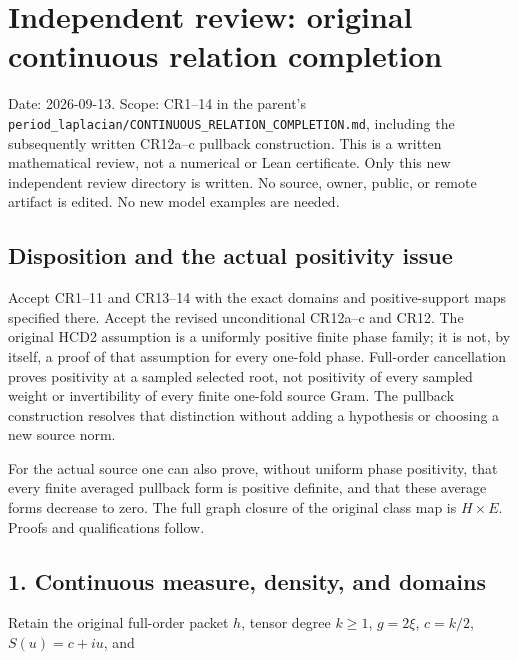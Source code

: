 \documentclass{article}
\begin{document}
\maketitle
\section{Independent review: original continuous relation completion}\label{independent-review-original-continuous-relation-completion}

Date: 2026-09-13. Scope: CR1--14 in the parent's \nolinkurl{period_laplacian/CONTINUOUS_RELATION_COMPLETION.md}, including the subsequently written CR12a--c pullback construction. This is a written mathematical review, not a numerical or Lean certificate. Only this new independent review directory is written. No source, owner, public, or remote artifact is edited. No new model examples are needed.

\subsection{Disposition and the actual positivity issue}\label{disposition-and-the-actual-positivity-issue}

Accept CR1--11 and CR13--14 with the exact domains and positive-support maps specified there. Accept the revised unconditional CR12a--c and CR12. The original HCD2 assumption is a uniformly positive finite phase family; it is not, by itself, a proof of that assumption for every one-fold phase. Full-order cancellation proves positivity at a sampled selected root, not positivity of every sampled weight or invertibility of every finite one-fold source Gram. The pullback construction resolves that distinction without adding a hypothesis or choosing a new source norm.

For the actual source one can also prove, without uniform phase positivity, that every finite averaged pullback form is positive definite, and that these average forms decrease to zero. The full graph closure of the original class map is \(H\times E\). Proofs and qualifications follow.

\subsection{1. Continuous measure, density, and domains}\label{continuous-measure-density-and-domains}

Retain the original full-order packet \(h\), tensor degree \(k\ge1\), \(g=2\xi\), \(c=k/2\), \(S(u)=c+iu\), and
\end{document}
